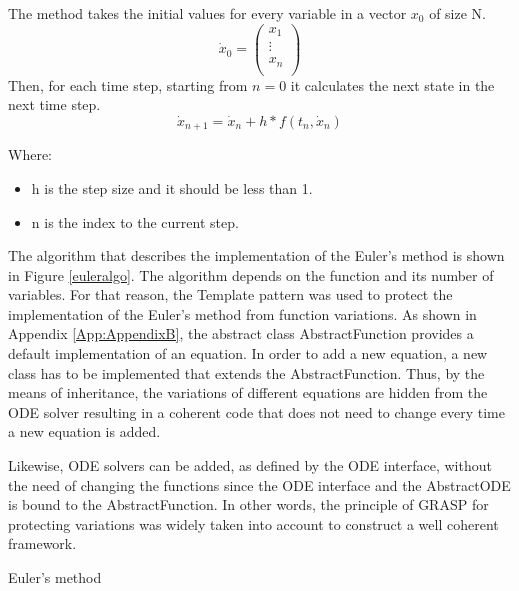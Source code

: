 The method takes the initial values for every variable in a vector $ x_0 $ of size N.
    $$ \dot{x}_0 = \begin{pmatrix}
x_1 \\ 
\vdots \\
x_n \\
\end{pmatrix}
$$ 
    Then, for each time step, starting from $ n = 0 $ it calculates the next state in the next time step.
    $$ \dot{x}_{n+1} = \dot{x}_n + h*f(t_n, \dot{x}_n) $$
    
Where:
\begin{itemize}
\item h is the step size and it should be less than 1.
\item n is the index to the current step.
\end{itemize}    

The algorithm that describes the implementation of the Euler's method is shown in Figure \ref{euleralgo}. The algorithm depends on the function and its number of variables. For that reason, the Template pattern was used to protect the implementation of the Euler's method from function variations. As shown in Appendix \ref{App:AppendixB}, the abstract class AbstractFunction provides a default implementation of an equation. In order to add a new equation, a new class has to be implemented that extends the AbstractFunction. Thus, by the means of inheritance, the variations of different equations are hidden from the ODE solver resulting in a coherent code that does not need to change every time a new equation is added. 

Likewise, ODE solvers can be added, as defined by the ODE interface, without the need of changing the functions since the ODE interface and the AbstractODE is bound to the AbstractFunction. In other words, the principle of GRASP for protecting variations was widely taken into account to construct a well coherent framework.

\begin{algorithm}                      
\caption{Euler's method}          
\label{euleralgo}                          
\begin{algorithmic}
    \ENDFOR
\end{algorithmic}
\end{algorithm}

